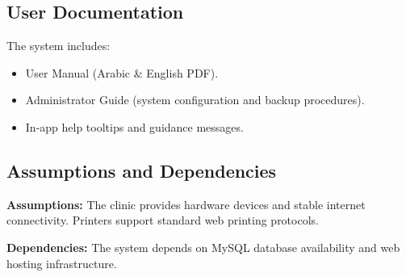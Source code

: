 \subsection{User Documentation}

The system includes:

\begin{itemize}
	\item User Manual (Arabic \& English PDF).
	\item Administrator Guide (system configuration and backup procedures).
	\item In-app help tooltips and guidance messages.
\end{itemize}

\subsection{Assumptions and Dependencies}

\textbf{Assumptions:}
The clinic provides hardware devices and stable internet connectivity. Printers support standard web printing protocols.

\textbf{Dependencies:}
The system depends on MySQL database availability and web hosting infrastructure.